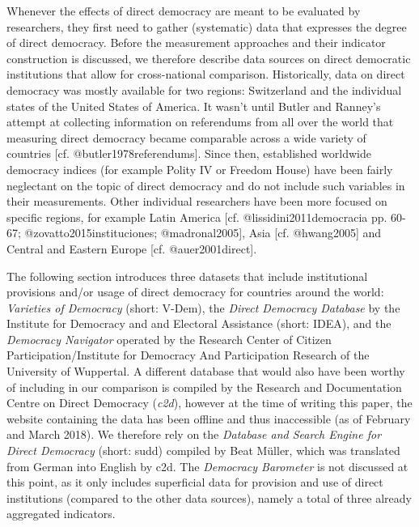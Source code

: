 \documentclass[]{article}
\begin{document}
Whenever the effects of direct democracy are meant to be evaluated by
researchers, they first need to gather (systematic) data that expresses
the degree of direct democracy. Before the measurement approaches and
their indicator construction is discussed, we therefore describe data
sources on direct democratic institutions that allow for cross-national
comparison. Historically, data on direct democracy was mostly available
for two regions: Switzerland and the individual states of the United
States of America. It wasn't until Butler and Ranney's attempt at
collecting information on referendums from all over the world that
measuring direct democracy became comparable across a wide variety of
countries {[}cf. @butler1978referendums{]}. Since then, established
worldwide democracy indices (for example Polity IV or Freedom House)
have been fairly neglectant on the topic of direct democracy and do not
include such variables in their measurements. Other individual
researchers have been more focused on specific regions, for example
Latin America {[}cf. @lissidini2011democracia pp. 60-67;
@zovatto2015instituciones; @madronal2005{]}, Asia {[}cf. @hwang2005{]}
and Central and Eastern Europe {[}cf. @auer2001direct{]}.

The following section introduces three datasets that include
institutional provisions and/or usage of direct democracy for countries
around the world: \emph{Varieties of Democracy} (short: V-Dem), the
\emph{Direct Democracy Database} by the Institute for Democracy and and
Electoral Assistance (short: IDEA), and the \emph{Democracy Navigator}
operated by the Research Center of Citizen Participation/Institute for
Democracy And Participation Research of the University of Wuppertal. A
different database that would also have been worthy of including in our
comparison is compiled by the Research and Documentation Centre on
Direct Democracy (\emph{c2d}), however at the time of writing this
paper, the website containing the data has been offline and thus
inaccessible (as of February and March 2018). We therefore rely on the
\emph{Database and Search Engine for Direct Democracy} (short: sudd)
compiled by Beat Müller, which was translated from German into English
by c2d. The \emph{Democracy Barometer} is not discussed at this point,
as it only includes superficial data for provision and use of direct
institutions (compared to the other data sources), namely a total of
three already aggregated indicators.
\end{document}
